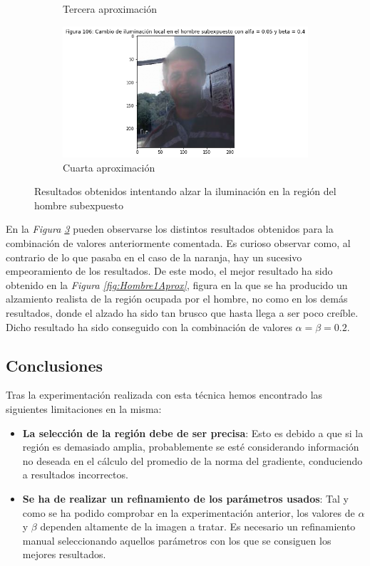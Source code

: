 \documentclass[11pt,twoside,titlepage,a4paper]{article}
\numberwithin{equation}{section} %
\theoremstyle{usual}
\begin{document}
\begin{figure}[h]
\begin{subfigure}[b]{.45\textwidth}
        \caption{Tercera aproximación}
        \label{fig:Hombre3Aprox}
    \end{subfigure}%
    \centering
    \begin{subfigure}[b]{.45\textwidth}
        \centering
        \includegraphics[width=\textwidth]{imagenes/PoissonImageEditing_cell_103_output_7.png}
        \caption{Cuarta aproximación}
        \label{fig:Hombre4Aprox}%
    \end{subfigure}
    \caption{Resultados obtenidos intentando alzar la iluminación en la región del hombre subexpuesto}
    \label{fig:resultadosHombre}
\end{figure}

En la \textit{Figura \ref{fig:resultadosHombre}} pueden observarse los distintos resultados obtenidos para la combinación de valores anteriormente comentada. Es curioso observar como, al contrario de lo que pasaba en el caso de la naranja, hay un sucesivo empeoramiento de los resultados. De este modo, el mejor resultado ha sido obtenido en la \textit{Figura \ref{fig:Hombre1Aprox}}, figura en la que se ha producido un alzamiento realista de la región ocupada por el hombre, no como en los demás resultados, donde el alzado ha sido tan brusco que hasta llega a ser poco creíble. Dicho resultado ha sido conseguido con la combinación de valores $\alpha = \beta = 0.2$.

\subsection{Conclusiones}

Tras la experimentación realizada con esta técnica hemos encontrado las siguientes limitaciones en la misma:

\begin{itemize}
    \item \textbf{La selección de la región debe de ser precisa}: Esto es debido a que si la región es demasiado amplia, probablemente se esté considerando información no deseada en el cálculo del promedio de la norma del gradiente, conduciendo a resultados incorrectos.
    \item \textbf{Se ha de realizar un refinamiento de los parámetros usados}: Tal y como se ha podido comprobar en la experimentación anterior, los valores de $\alpha$ y $\beta$ dependen altamente de la imagen a tratar. Es necesario un refinamiento manual seleccionando aquellos parámetros con los que se consiguen los mejores resultados.
\end{itemize}
\end{document}
